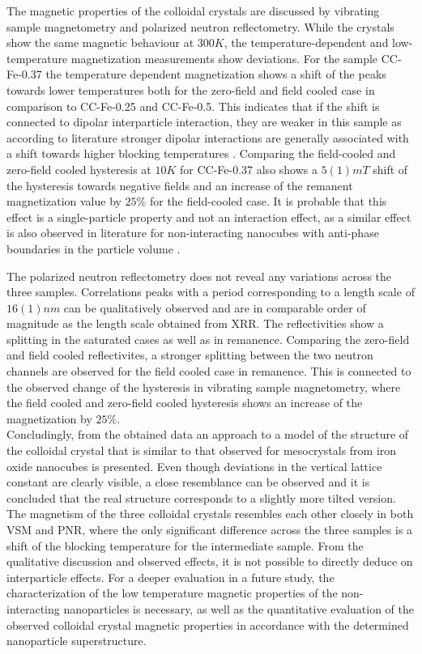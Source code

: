 \documentclass[\main/dresen_thesis.tex]{subfiles}
\begin{document}
  The magnetic properties of the colloidal crystals are discussed by vibrating sample magnetometry and polarized neutron reflectometry.
  While the crystals show the same magnetic behaviour at $300 \unit{K}$, the temperature-dependent and low-temperature magnetization measurements show deviations.
  For the sample CC-Fe-0.37 the temperature dependent magnetization shows a shift of the peaks towards lower temperatures both for the zero-field and field cooled case in comparison to CC-Fe-0.25 and CC-Fe-0.5.
  This indicates that if the shift is connected to dipolar interparticle interaction, they are weaker in this sample as according to literature stronger dipolar interactions are generally associated with a shift towards higher blocking temperatures \cite{Morup_2010_Magne, Pauly_2012_Sized, Otero_2000_Influ}.
  Comparing the field-cooled and zero-field cooled hysteresis at $10 \unit{K}$ for CC-Fe-0.37 also shows a $5(1) \unit{mT}$ shift of the hysteresis towards negative fields and an increase of the remanent magnetization value by $25 \%$ for the field-cooled case.
  It is probable that this effect is a single-particle property and not an interaction effect, as a similar effect is also observed in literature for non-interacting nanocubes with anti-phase boundaries in the particle volume \cite{Wetterskog_2013_Anoma}.

  The polarized neutron reflectometry does not reveal any variations across the three samples.
  Correlations peaks with a period corresponding to a length scale of $16(1) \unit{nm}$ can be qualitatively observed and are in comparable order of magnitude as the length scale obtained from XRR.
  The reflectivities show a splitting in the saturated cases as well as in remanence.
  Comparing the zero-field and field cooled reflectivites, a stronger splitting between the two neutron channels are observed for the field cooled case in remanence.
  This is connected to the observed change of the hysteresis in vibrating sample magnetometry, where the field cooled and zero-field cooled hysteresis shows an increase of the magnetization by $25 \%$.
  \\

  Concludingly, from the obtained data an approach to a model of the structure of the colloidal crystal that is similar to that observed for mesocrystals from iron oxide nanocubes is presented.
  Even though deviations in the vertical lattice constant are clearly visible, a close resemblance can be observed and it is concluded that the real structure corresponds to a slightly more tilted version.
  The magnetism of the three colloidal crystals resembles each other closely in both VSM and PNR, where the only significant difference across the three samples is a shift of the blocking temperature for the intermediate sample.
  From the qualitative discussion and observed effects, it is not possible to directly deduce on interparticle effects.
  For a deeper evaluation in a future study, the characterization of the low temperature magnetic properties of the non-interacting nanoparticles is necessary, as well as the quantitative evaluation of the observed colloidal crystal magnetic properties in accordance with the determined nanoparticle superstructure.
\end{document}
